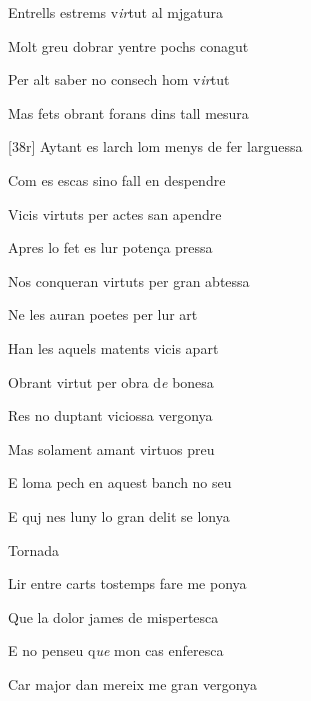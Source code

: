 \documentclass[12pt]{article}
\begin{document}
\begin{estrofa}

 Entrells estrems v\textit{ir}tut al mjgatura

 Molt greu dobrar yentre pochs conagut

 Per alt saber no consech hom v\textit{ir}tut

 Mas fets obrant forans dins tall mesura

 [38r] Aytant es larch lom menys de fer larguessa

 Com es escas sino fall en despendre

 Vicis virtuts per actes san apendre

 Apres lo fet es lur poten\c{c}a pressa

\end{estrofa}



\begin{estrofa}

 Nos conqueran virtuts per gran abtessa

 Ne les auran poetes per lur art

 Han les aquels matents vicis apart

 Obrant virtut per obra d\textit{e} bonesa

 Res no duptant viciossa vergonya

 Mas solament amant virtuos preu

 E loma pech en aquest banch no seu

 E quj nes luny lo gran delit se lonya

\end{estrofa}


\begin{estrofaExtra}%




\begin{tornada}

Tornada

\end{tornada}


\end{estrofaExtra}


\begin{estrofa}

 Lir entre carts tostemps fare me ponya

 Que la dolor james de mispertesca

 E no penseu q\textit{ue} mon cas enferesca

 Car major dan mereix me gran vergonya

\end{estrofa}
\end{document}
